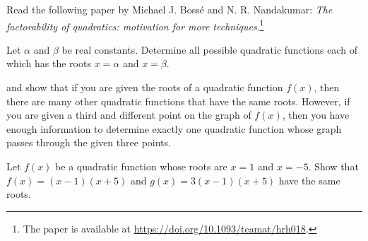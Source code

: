 \documentclass[a4paper,oneside,12pt]{article}
\begin{document}
\begin{problem}
\item Read the following paper by Michael J. Boss\'e and
  N. R. Nandakumar: \emph{The factorability of quadratics: motivation
    for more techniques}.\footnote{
    The paper is available at
    \url{https://doi.org/10.1093/teamat/hrh018}.
  }

\item\label{prob:quadroots:given_roots_all_possible_quadratics}
  Let $\alpha$ and $\beta$ be real constants.  Determine all possible
  quadratic functions each of which has the roots $x = \alpha$ and
  $x = \beta$.

\item{} and
   show
  that if you are given the roots of a quadratic function $f(x)$, then
  there are many other quadratic functions that have the same roots.
  However, if you are given a third and different point on the graph
  of $f(x)$, then you have enough information to determine exactly one
  quadratic function whose graph passes through the given three
  points.
  \begin{packedenum}
  \item\label{subprob:quadroots:given_roots_x1_x5}
    Let $f(x)$ be a quadratic function whose roots are $x = 1$ and
    $x = -5$.  Show that $f(x) = (x - 1) (x + 5)$ and
    $g(x) = 3(x - 1) (x + 5)$ have the same roots.


\end{packedenum}
\end{problem}
\end{document}
